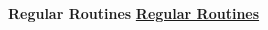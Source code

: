 \begin{columns}
\begin{column}{0.333\columnwidth}
\begin{columns}
\begin{column}{0.5\linewidth}
\begin{block}
\ifdefined\POSTER
\end{block}
\fi

\ifdefined\POSTER
\end{column}
\fi



\ifdefined\POSTER
\begin{column}{0.28\linewidth}
\begin{block}{\small \bf Regular Routines}
\else
\underline{\bf Regular Routines}\\ 
\fi 

%


\ifdefined\POSTER
\end{block}
\end{column}%
\fi


\end{columns}
\end{column}
\end{columns}
